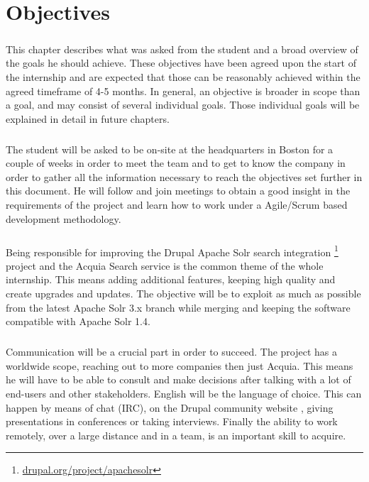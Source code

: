 \chapter{Objectives}
\paragraph{}
This chapter describes what was asked from the student and a broad overview of the goals he should achieve. These objectives have been agreed upon the start of the internship and are expected that those can be reasonably achieved within the agreed timeframe of 4-5 months. In general, an objective is broader in scope than a goal, and may consist of several individual goals. Those individual goals will be explained in detail in future chapters.

\paragraph{}
The student will be asked to be on-site at the headquarters in Boston for a couple of weeks in order to meet the team and to get to know the company in order to gather all the information necessary to reach the objectives set further in this document. He will follow and join meetings to obtain a good insight in the requirements of the project and learn how to work under a Agile/Scrum based development methodology.

\paragraph{}
Being responsible for improving the Drupal Apache Solr search integration \footnote{\url{drupal.org/project/apachesolr}} project and the Acquia Search service is the common theme of the whole internship. This means adding additional features, keeping high quality and create upgrades and updates. The objective will be to exploit as much as possible from the latest Apache Solr 3.x branch while merging and keeping the software compatible with Apache Solr 1.4.

\paragraph{}
Communication will be a crucial part in order to succeed. The project has a worldwide scope, reaching out to more companies then just Acquia. This means he will have to be able to consult and make decisions after talking with a lot of end-users and other stakeholders. English will be the language of choice. This can happen by means of chat (IRC), on the Drupal community website \cite{drupal_site}, giving presentations in conferences or taking interviews.
Finally the ability to work remotely, over a large distance and in a team, is an important skill to acquire.

